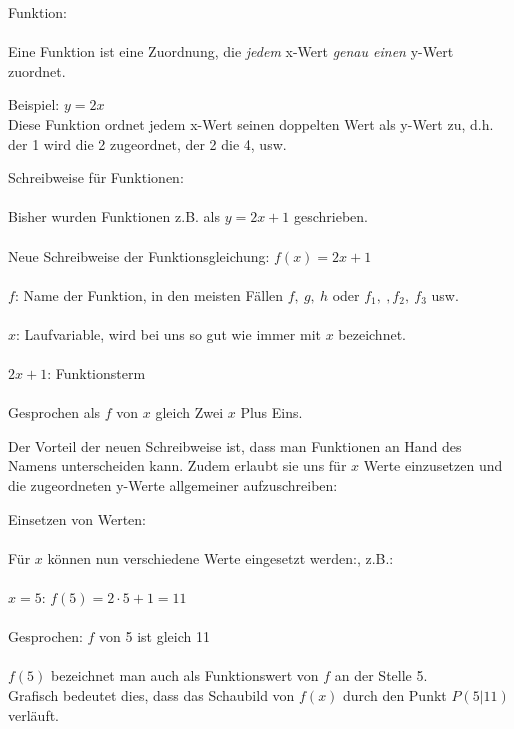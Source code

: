 \begin{tcolorbox}
	Funktion:\\ \\
	\textcolor{loestc}{Eine Funktion ist eine Zuordnung, die \textit{jedem} x-Wert \textit{genau einen} y-Wert zuordnet.\\
	}
\end{tcolorbox}
Beispiel: \(y=2x\)\\
\textcolor{loes}{Diese Funktion ordnet jedem x-Wert seinen doppelten Wert als y-Wert zu, d.h. der 1 wird die 2 zugeordnet, der 2 die 4, usw.}\\
\begin{tcolorbox}
	Schreibweise für Funktionen:\\ \\
	\textcolor{loestc}{Bisher wurden Funktionen z.B. als \(y=2x+1\) geschrieben.\\ \\
		Neue Schreibweise der Funktionsgleichung: \(f(x)=2x+1\)\\ \\
		\(f\): Name der Funktion, in den meisten Fällen \(f,\ g,\ h\) oder \(f_1,\ ,f_2,\ f_3\) usw.\\ \\
		\(x\): Laufvariable, wird bei uns so gut wie immer mit \(x\) bezeichnet.\\ \\
		\(2x+1\): Funktionsterm\\ \\
		Gesprochen als \(f\) von \(x\) gleich Zwei \(x\) Plus Eins.\\
	}
\end{tcolorbox}
Der Vorteil der neuen Schreibweise ist, dass man Funktionen an Hand des Namens unterscheiden kann. Zudem erlaubt sie uns für \(x\) Werte einzusetzen und die zugeordneten y-Werte allgemeiner aufzuschreiben:
\begin{tcolorbox}
	Einsetzen von Werten:\\ \\
	\textcolor{loestc}{Für \(x\) können nun verschiedene Werte eingesetzt werden:, z.B.:\\ \\
		\(x=5\): \(f(5)=2\cdot 5+1=11\)\\ \\
		Gesprochen: \(f\) von 5 ist gleich 11\\ \\
		\(f(5)\) bezeichnet man auch als Funktionswert von \(f\) an der Stelle 5.\\
		Grafisch bedeutet dies, dass das Schaubild von \(f(x)\) durch den Punkt \(P(5|11)\) verläuft.
	}
\end{tcolorbox}
